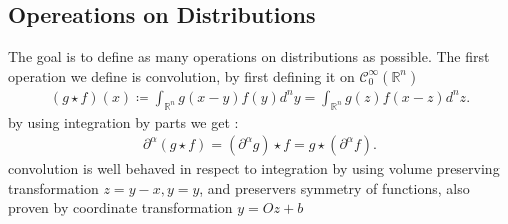 \subsection{Opereations on Distributions} %
\label{sub:Opereations on Distributions}
The goal is to define as many operations on  distributions as possible.
The first operation we define is convolution, by first defining it on $\mathcal{C}_0^\infty(\mathbb{R}^{n} )$
\begin{align*}
  (g \star f)(x) \coloneqq  \int_{\mathbb{R}^{n } }  g(x-y)f(y) d^{n }y = \int_{\mathbb{R}^{n } }g(z)f(x-z) d^{n} z
.\end{align*}
by using integration by parts we get : 
\begin{align*}
  \partial ^{\alpha }(g \star f) = (\partial ^{\alpha } g ) \star  f = g \star (\partial ^{ \alpha }f ) 
.\end{align*}
convolution is well behaved in respect to integration by using volume preserving transformation $z=y-x , y=y$,
and preservers symmetry of functions, also proven by coordinate transformation $y=Oz+b$


